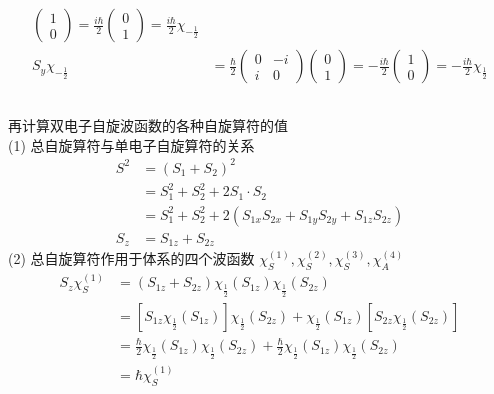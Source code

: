 \begin{frame}[label=current]
\[\begin{aligned}
\begin{pmatrix}
      1\\
      0
     \end{pmatrix}  = \frac{i\hbar}{2} \begin{pmatrix}
      0\\
      1
    \end{pmatrix} = \frac{i\hbar}{2}\chi_{-\frac{1}{2}} \\ 
    S_y \chi_{-\frac{1}{2}} &= \frac{\hbar}{2}\begin{pmatrix}
      0 & -i\\
      i & 0
     \end{pmatrix} \begin{pmatrix}
      0\\
      1
     \end{pmatrix}  = -\frac{i\hbar}{2} \begin{pmatrix}
      1\\
      0
    \end{pmatrix} = -\frac{i\hbar}{2}\chi_{\frac{1}{2}} \\
  \end{aligned} \]
\end{frame} 

\begin{frame}[label=current]
  \frametitle{}
  再计算双电子自旋波函数的各种自旋算符的值 \\
  (1) 总自旋算符与单电子自旋算符的关系
  \[ \begin{aligned}
    S^2 &= (S_1 + S_2)^2 \\
    &=  S^2_1 + S^2_2 + 2S_1 \cdot S_2 \\
    &=  S^2_1 + S^2_2 + 2(S_{1x}S_{2x} +S_{1y}S_{2y} + S_{1z}S_{2z} ) \\
    S_z &= S_{1z} + S_{2z}
  \end{aligned}
  \]
  (2) 总自旋算符作用于体系的四个波函数 $\chi ^{(1)}_S, \chi ^{(2)}_S, \chi ^{(3)}_S, \chi ^{(4)}_A$
  \[ \begin{aligned}
    S_z \chi ^{(1)}_S &= (S_{1z} + S_{2z})\chi _{ \frac{1}{2}} (S_{1z})\chi_{ \frac{1}{2}} (S_{2z}) \\
    &= \left[S_{1z}\chi _{ \frac{1}{2}} (S_{1z})\right]\chi_{ \frac{1}{2}} (S_{2z}) +  \chi_{ \frac{1}{2}} (S_{1z})\left[S_{2z}\chi _{ \frac{1}{2}} (S_{2z})\right] \\
    &= \frac{\hbar}{2}\chi _{ \frac{1}{2}} (S_{1z})\chi_{ \frac{1}{2}} (S_{2z}) + \frac{\hbar}{2} \chi_{ \frac{1}{2}} (S_{1z}) \chi_{ \frac{1}{2}} (S_{2z}) \\
    &= \hbar \chi ^{(1)}_S
  \end{aligned}
  \]
\end{frame} 


